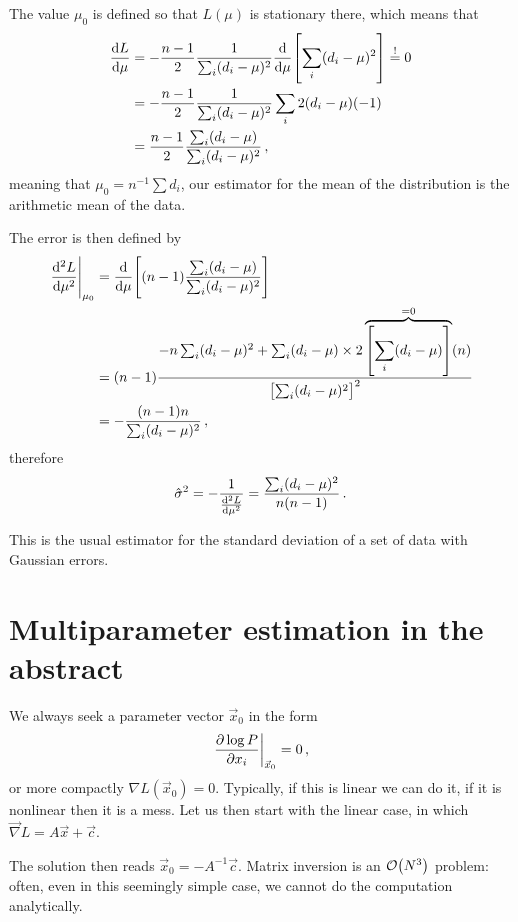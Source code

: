 \documentclass[main.tex]{subfiles}
\begin{document}
The value \(\mu_0\) is defined so that \(L(\mu )\) is stationary there, which means that 
%
\begin{align}
\dv{L}{\mu } &= -\frac{n-1}{2}  \frac{1}{\sum _{i} (d_i - \mu)^2} \dv{}{\mu } \qty[\sum _{i} (d_i - \mu)^2] \overset{!}{=} 0  \\
&= -\frac{n-1}{2}  \frac{1}{\sum _{i} (d_i - \mu)^2} \sum _{i} 2 (d_i - \mu ) (-1)  \\
&= \frac{n-1}{2} \frac{\sum _{i} (d_i - \mu ) }{\sum_i (d_i - \mu )^2}
\,,
\end{align}
%
meaning that \(\mu_0 = n^{-1} \sum d_i\), our estimator for the mean of the distribution is the arithmetic mean of the data. 


The error is then defined by 
%
\begin{align}
\eval{\dv[2]{L}{\mu }}_{\mu_0 } &= \dv{}{\mu } \qty[(n-1) \frac{\sum _{i} (d_i - \mu)}{\sum _{i } (d_i - \mu )^2}]  \\
&= (n-1) \frac{- n \sum _{i} (d_i - \mu)^2 + \sum _{i} (d_i - \mu) \times 2 \overbrace{\qty[\sum_i (d_i - \mu )]}^{= 0} (n)}{\qty[\sum _{i} (d_i - \mu)^2]^2}  \\
&= - \frac{(n-1)n}{\sum _{i} (d_i - \mu)^2}
\,,
\end{align}
%
therefore 
%
\begin{align}
\hat{\sigma}^2 = - \frac{1}{\dv[2]{L}{\mu }} = \frac{\sum _{i}(d_i - \mu)^2}{n ( n-1)}
\,.
\end{align}

This is the usual estimator for the standard deviation of a set of data with Gaussian errors. 

\section{Multiparameter estimation in the abstract}

We always seek a parameter vector \(\vec{x}_0\) in the form 
%
\begin{align}
\eval{\pdv{\log P}{x_i} }_{\vec{x}_0} = 0
\,,
\end{align}
%
or more compactly \(\nabla L (\vec{x}_0) =0 \). 
Typically, if this is linear we can do it, if it is nonlinear then it is a mess. 
Let us then start with the linear case, in which \(\vec{\nabla} L  = A \vec{x} + \vec{c}\).  

The solution then reads \(\vec{x}_0 = -A^{-1} \vec{c}\). 
Matrix inversion is an \(\order{N^3}\) problem: often, even in this seemingly simple case, we cannot do the computation analytically. 
\end{document}
